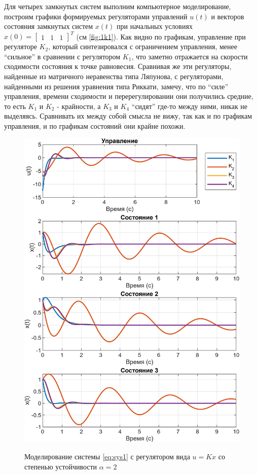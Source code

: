Для четырех замкнутых систем выполним компьютерное моделирование,
построим графики формируемых регуляторами управлений $u(t)$ и векторов
состояния замкнутых систем $x(t)$ при начальных условиях $x(0) =\begin{bmatrix}
    1&1&1
\end{bmatrix}^T$ (см \autoref{fig:1k1}). Как видно по графикам, управление
при регуляторе $K_2$, который синтезировался с ограничением управления, менее
``сильное'' в сравнении с регулятором $K_1$, что заметно отражается на 
скорости сходимости состояния к точке равновесия. Сравнивая же эти регуляторы,
найденные из матричного неравенства типа Ляпунова, с регуляторами, найденными
из решения уравнения типа Риккати, замечу, что по ``силе'' управления, времени
сходимости и перерегулировании они получились средние, то есть 
$K_1$ и $K_2$ - крайности, а $K_3$ и $K_4$ ``сидят'' где-то между ними,
никак не выделяясь. Сравнивать их между собой смысла не вижу, так как и по 
графикам управления, и по графикам состояний они крайне похожи.

\begin{figure}[H]
    \centering
    \caption{Моделирование системы \eqref{eq:sys1} с регулятором вида $u=Kx$
    со степенью устойчивости $\alpha=2$}
    \includegraphics[width=\linewidth]{figs/task10.png}
    \label{fig:1k1}
\end{figure}





